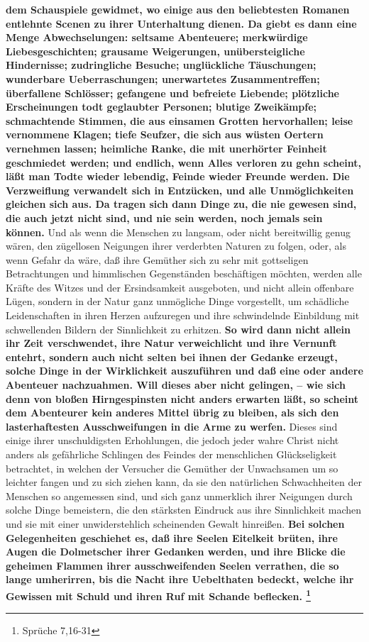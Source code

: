 \textbf{dem Schauspiele
gewidmet, wo einige aus den beliebtesten Romanen entlehnte Scenen zu ihrer
Unterhaltung dienen. Da giebt es dann eine Menge Abwechselungen: seltsame
Abenteuere; merkwürdige Liebesgeschichten; grausame Weigerungen,
unübersteigliche Hindernisse; zudringliche Besuche; unglückliche Täuschungen;
wunderbare Ueberraschungen; unerwartetes Zusammentreffen; überfallene Schlösser;
gefangene und befreiete Liebende; plötzliche Erscheinungen todt geglaubter
Personen; blutige Zweikämpfe; schmachtende Stimmen, die aus einsamen Grotten
hervorhallen; leise vernommene Klagen; tiefe Seufzer, die sich aus wüsten
Oertern vernehmen lassen; heimliche Ranke, die mit unerhörter Feinheit
geschmiedet werden; und endlich, wenn Alles verloren zu gehn scheint, läßt man
Todte wieder lebendig, Feinde wieder Freunde werden. Die Verzweiflung verwandelt
sich in Entzücken, und alle Unmöglichkeiten gleichen sich aus. Da tragen sich
dann Dinge zu, die nie gewesen sind, die auch jetzt nicht sind, und nie sein
werden, noch jemals sein können.} Und als wenn die Menschen zu langsam, oder
nicht bereitwillig genug wären, den zügellosen Neigungen ihrer verderbten
Naturen zu folgen, oder, als wenn Gefahr da wäre, daß ihre Gemüther sich zu sehr
mit gottseligen Betrachtungen und himmlischen Gegenständen beschäftigen möchten,
werden alle Kräfte des Witzes und der Ersindsamkeit ausgeboten, und nicht allein
offenbare Lügen, sondern in der Natur ganz unmögliche Dinge vorgestellt, um
schädliche Leidenschaften in ihren Herzen aufzuregen und ihre schwindelnde
Einbildung mit schwellenden Bildern der Sinnlichkeit zu erhitzen. \textbf{So
wird dann
nicht allein ihr Zeit verschwendet, ihre Natur verweichlicht und ihre Vernunft
entehrt, sondern auch nicht selten bei ihnen der Gedanke erzeugt, solche Dinge
in der Wirklichkeit auszuführen und daß eine oder andere Abenteuer nachzuahmen.
Will dieses aber nicht gelingen, -- wie sich denn von bloßen Hirngespinsten
nicht anders erwarten läßt, so scheint dem Abenteurer kein anderes Mittel übrig
zu bleiben, als sich den lasterhaftesten Ausschweifungen in die Arme zu werfen.}
Dieses sind einige ihrer unschuldigsten Erhohlungen, die jedoch jeder wahre
Christ nicht anders als gefährliche Schlingen des Feindes der menschlichen
Glückseligkeit betrachtet, in welchen der Versucher die Gemüther der Unwachsamen
um so leichter fangen und zu sich ziehen kann, da sie den natürlichen
Schwachheiten der Menschen so angemessen sind, und sich ganz unmerklich ihrer
Neigungen durch solche Dinge bemeistern, die den stärksten Eindruck aus ihre
Sinnlichkeit machen und sie mit einer unwiderstehlich scheinenden Gewalt
hinreißen. \textbf{Bei solchen Gelegenheiten geschiehet es, daß ihre Seelen
Eitelkeit
brüten, ihre Augen die Dolmetscher ihrer Gedanken werden, und ihre Blicke die
geheimen Flammen ihrer ausschweifenden Seelen verrathen, die so lange
umherirren, bis die Nacht ihre Uebelthaten bedeckt, welche ihr Gewissen mit
Schuld und ihren Ruf mit Schande beflecken.
\footnote{Sprüche 7,16-31}}

